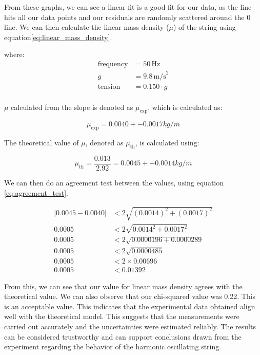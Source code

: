 \documentclass[11pt]{article}
\begin{document}
    From these graphs, we can see a linear fit is a good fit for our data, as the line hits all our data points and our residuals are randomly scattered around the 0 line.
    We can then calculate the linear mass density ($\mu$) of the string using equation\ref{eq:linear_mass_density}.
    
    where:
    \begin{align*}
    \text{frequency} &= 50 \, \text{Hz} \\
    g &= 9.8 \, \text{m/s}^2 \\
    \text{tension} &= 0.150 \cdot g\\
    \end{align*}
    
    $\mu$ calculated from the slope is denoted as $\mu_{\text{exp}}$, which is calculated as:
    
    \begin{equation}
    \mu_{\text{exp}} = 0.0040 +- 0.0017 kg/m
    \end{equation}
    
    The theoretical value of $\mu$, denoted as $\mu_{\text{th}}$, is calculated using:
    
    \begin{equation}
    \mu_{\text{th}} = \frac{0.013}{2.92} = 0.0045 +- 0.0014 kg/m
    \end{equation}

    We can then do an agreement test between the values, using equation \ref{eq:agreement_test}.

    \begin{align*}
    |0.0045 - 0.0040| &< 2 \sqrt{(0.0014)^2 + (0.0017)^2} \\
    0.0005 &< 2 \sqrt{0.0014^2 + 0.0017^2} \\
    0.0005 &< 2 \sqrt{0.0000196 + 0.0000289} \\
    0.0005 &< 2 \sqrt{0.0000485} \\
    0.0005 &< 2 \times 0.00696 \\
    0.0005 &< 0.01392
    \end{align*}

    From this, we can see that our value for linear mass density agrees with the theoretical value. We can also observe that our chi-squared value was 0.22. This is an acceptable value. This indicates that the experimental data obtained align well with the theoretical model. This suggests that the measurements were carried out accurately and the uncertainties were estimated reliably. The results can be considered trustworthy and can support conclusions drawn from the experiment regarding the behavior of the harmonic oscillating string. 
\end{document}
